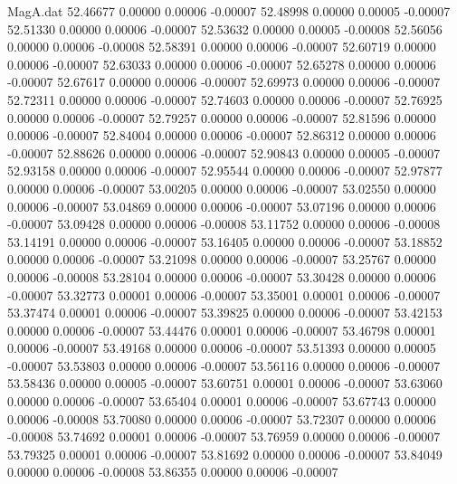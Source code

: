 \begin{filecontents}{MagA.dat}
  52.46677    0.00000    0.00006   -0.00007
  52.48998    0.00000    0.00005   -0.00007
  52.51330    0.00000    0.00006   -0.00007
  52.53632    0.00000    0.00005   -0.00008
  52.56056    0.00000    0.00006   -0.00008
  52.58391    0.00000    0.00006   -0.00007
  52.60719    0.00000    0.00006   -0.00007
  52.63033    0.00000    0.00006   -0.00007
  52.65278    0.00000    0.00006   -0.00007
  52.67617    0.00000    0.00006   -0.00007
  52.69973    0.00000    0.00006   -0.00007
  52.72311    0.00000    0.00006   -0.00007
  52.74603    0.00000    0.00006   -0.00007
  52.76925    0.00000    0.00006   -0.00007
  52.79257    0.00000    0.00006   -0.00007
  52.81596    0.00000    0.00006   -0.00007
  52.84004    0.00000    0.00006   -0.00007
  52.86312    0.00000    0.00006   -0.00007
  52.88626    0.00000    0.00006   -0.00007
  52.90843    0.00000    0.00005   -0.00007
  52.93158    0.00000    0.00006   -0.00007
  52.95544    0.00000    0.00006   -0.00007
  52.97877    0.00000    0.00006   -0.00007
  53.00205    0.00000    0.00006   -0.00007
  53.02550    0.00000    0.00006   -0.00007
  53.04869    0.00000    0.00006   -0.00007
  53.07196    0.00000    0.00006   -0.00007
  53.09428    0.00000    0.00006   -0.00008
  53.11752    0.00000    0.00006   -0.00008
  53.14191    0.00000    0.00006   -0.00007
  53.16405    0.00000    0.00006   -0.00007
  53.18852    0.00000    0.00006   -0.00007
  53.21098    0.00000    0.00006   -0.00007
  53.25767    0.00000    0.00006   -0.00008
  53.28104    0.00000    0.00006   -0.00007
  53.30428    0.00000    0.00006   -0.00007
  53.32773    0.00001    0.00006   -0.00007
  53.35001    0.00001    0.00006   -0.00007
  53.37474    0.00001    0.00006   -0.00007
  53.39825    0.00000    0.00006   -0.00007
  53.42153    0.00000    0.00006   -0.00007
  53.44476    0.00001    0.00006   -0.00007
  53.46798    0.00001    0.00006   -0.00007
  53.49168    0.00000    0.00006   -0.00007
  53.51393    0.00000    0.00005   -0.00007
  53.53803    0.00000    0.00006   -0.00007
  53.56116    0.00000    0.00006   -0.00007
  53.58436    0.00000    0.00005   -0.00007
  53.60751    0.00001    0.00006   -0.00007
  53.63060    0.00000    0.00006   -0.00007
  53.65404    0.00001    0.00006   -0.00007
  53.67743    0.00000    0.00006   -0.00008
  53.70080    0.00000    0.00006   -0.00007
  53.72307    0.00000    0.00006   -0.00008
  53.74692    0.00001    0.00006   -0.00007
  53.76959    0.00000    0.00006   -0.00007
  53.79325    0.00001    0.00006   -0.00007
  53.81692    0.00000    0.00006   -0.00007
  53.84049    0.00000    0.00006   -0.00008
  53.86355    0.00000    0.00006   -0.00007

\end{filecontents}
